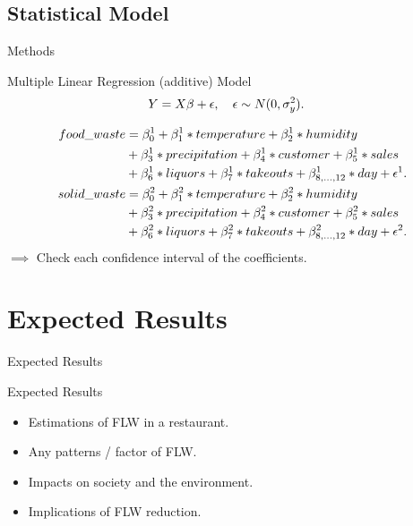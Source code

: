 \documentclass{beamer}
\begin{document}
\subsection{Statistical Model}
\begin{frame}{Methods}
    \small
    \begin{block}{Multiple Linear Regression (additive) Model}
        \[
        \begin{aligned}
            \small Y &=  X\beta + \epsilon, \hspace{1em}
            \epsilon \sim N(0, \sigma_y^2).
        \end{aligned}
        \]
    \end{block}
    \begin{align*}
        \small food\_waste 
        &= \beta_0^1 + \beta_1^1 * temperature + \beta_2^1 * humidity \\
        &+ \beta_3^1 * precipitation + \beta_4^1 * customer + \beta_5^1 * sales\\ 
        &+ \beta_6^1 * liquors + \beta_7^1 * takeouts 
        + \beta_{8,...,12}^1 * day + \epsilon^1.\\
        \small solid\_waste 
        &= \beta_0^2 + \beta_1^2 * temperature + \beta_2^2 * humidity \\
        &+ \beta_3^2 * precipitation + \beta_4^2 * customer + \beta_5^2 * sales\\ 
        &+ \beta_6^2 * liquors + \beta_7^2 * takeouts 
        + \beta_{8,...,12}^2 * day + \epsilon^2.
    \end{align*}
    \normalsize $\implies$ Check each confidence interval of the coefficients.
\end{frame}

\section{Expected Results}
\begin{frame}{Expected Results}
    \begin{block}{Expected Results}
        \begin{itemize}
            \item Estimations of FLW in a restaurant.
            \item Any patterns / factor of FLW.
            \item Impacts on society and the environment.
            \item Implications of FLW reduction.
        \end{itemize}
    \end{block}
\end{frame}
\end{document}
